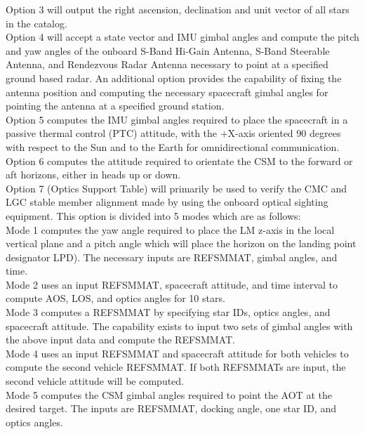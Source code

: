 \documentclass[11pt]{article} %
\begin{document}
Option 3 will output the right ascension, declination and unit vector of all stars in the catalog.\\

Option 4 will accept a state vector and IMU gimbal angles and compute the pitch and yaw angles of the onboard S-Band Hi-Gain Antenna, S-Band Steerable Antenna, and Rendezvous Radar Antenna necessary to point at a specified ground based radar. An additional option provides the capability of fixing the antenna position and computing the necessary spacecraft gimbal angles for pointing the antenna at a specified ground station.\\

Option 5 computes the IMU gimbal angles required to place the spacecraft in a passive thermal control (PTC) attitude, with the +X-axis oriented 90 degrees with respect to the Sun and to the Earth for omnidirectional communication.\\

Option 6 computes the attitude required to orientate the CSM to the forward or aft horizons, either in heads up or down.\\

Option 7 (Optics Support Table) will primarily be used to verify the CMC and LGC stable member alignment made by using the onboard optical sighting equipment. This option is divided into 5 modes which are as follows:\\

Mode 1 computes the yaw angle required to place the LM z-axis in the local vertical plane and a pitch angle which will place the horizon on the landing point designator LPD). The necessary inputs are REFSMMAT, gimbal angles, and time.\\

Mode 2 uses an input REFSMMAT, spacecraft attitude, and time interval to compute AOS, LOS, and optics angles for 10 stars.\\

Mode 3 computes a REFSMMAT by specifying star IDs, optics angles, and spacecraft attitude. The capability exists to input two sets of gimbal angles with the above input data and compute the REFSMMAT.\\

Mode 4 uses an input REFSMMAT and spacecraft attitude for both vehicles to compute the second vehicle REFSMMAT. If both REFSMMATs are input, the second vehicle attitude will be computed.\\

Mode 5 computes the CSM gimbal angles required to point the AOT at the desired target. The inputs are REFSMMAT, docking angle, one star ID, and optics angles.\\
\end{document}

